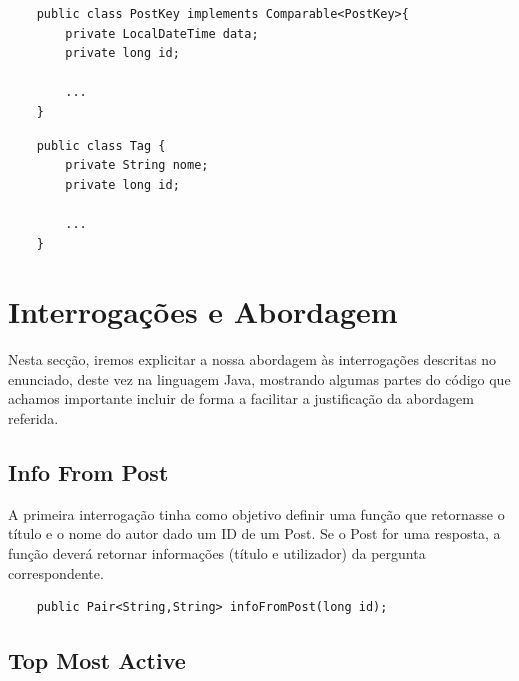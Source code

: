 \documentclass[a4paper, 11pt, oneside]{article}
\begin{document}
\begin{lstlisting}
	public class PostKey implements Comparable<PostKey>{
	    private LocalDateTime data;
	    private long id;

	    ...
	}
\end{lstlisting}

\begin{lstlisting}
	public class Tag {
	    private String nome;
	    private long id;

	    ...
	}
\end{lstlisting}





\section{Interrogações e Abordagem}

\label{queries}
Nesta secção, iremos explicitar a nossa abordagem às interrogações descritas no enunciado, deste vez na linguagem Java, mostrando algumas partes do código que 
achamos importante incluir de forma a facilitar a justificação da abordagem referida.



\subsection{Info From Post}

A primeira interrogação tinha como objetivo definir uma função que retornasse o título e o nome do autor dado um ID de um Post. Se o Post for uma resposta, a função 
deverá retornar informações (título e utilizador) da pergunta correspondente.

\begin{lstlisting}
	public Pair<String,String> infoFromPost(long id);
\end{lstlisting}



\subsection{Top Most Active}
\end{document}
